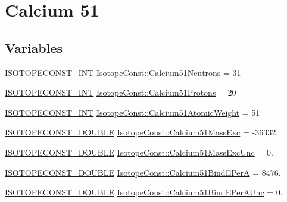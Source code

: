\hypertarget{group___isotope_const-_calcium-_ca51}{}\section{Calcium 51}
\label{group___isotope_const-_calcium-_ca51}
\subsection*{Variables}
\begin{DoxyCompactItemize}
\item 
\mbox{\hyperlink{group___isotope_const-_macros_ga5f18360b3e99483a35c32d789e62621c}{I\+S\+O\+T\+O\+P\+E\+C\+O\+N\+S\+T\+\_\+\+I\+NT}} \mbox{\hyperlink{group___isotope_const-_calcium-_ca51_gabeaa3ad8231b43ea455052977314cfff}{Isotope\+Const\+::\+Calcium51\+Neutrons}} = 31
\item 
\mbox{\hyperlink{group___isotope_const-_macros_ga5f18360b3e99483a35c32d789e62621c}{I\+S\+O\+T\+O\+P\+E\+C\+O\+N\+S\+T\+\_\+\+I\+NT}} \mbox{\hyperlink{group___isotope_const-_calcium-_ca51_gaf172d213a7a0a01c02d3186d903d487e}{Isotope\+Const\+::\+Calcium51\+Protons}} = 20
\item 
\mbox{\hyperlink{group___isotope_const-_macros_ga5f18360b3e99483a35c32d789e62621c}{I\+S\+O\+T\+O\+P\+E\+C\+O\+N\+S\+T\+\_\+\+I\+NT}} \mbox{\hyperlink{group___isotope_const-_calcium-_ca51_ga2e94246098738261c063e210fcd53146}{Isotope\+Const\+::\+Calcium51\+Atomic\+Weight}} = 51
\item 
\mbox{\hyperlink{group___isotope_const-_macros_ga8f45a7272ce02c0b4c65c44636ed719a}{I\+S\+O\+T\+O\+P\+E\+C\+O\+N\+S\+T\+\_\+\+D\+O\+U\+B\+LE}} \mbox{\hyperlink{group___isotope_const-_calcium-_ca51_gab2ba1e5603e8c2fd06f58414e5210765}{Isotope\+Const\+::\+Calcium51\+Mass\+Exc}} = -\/36332.
\item 
\mbox{\hyperlink{group___isotope_const-_macros_ga8f45a7272ce02c0b4c65c44636ed719a}{I\+S\+O\+T\+O\+P\+E\+C\+O\+N\+S\+T\+\_\+\+D\+O\+U\+B\+LE}} \mbox{\hyperlink{group___isotope_const-_calcium-_ca51_gac78973eef37c56e661ec92b6a499260d}{Isotope\+Const\+::\+Calcium51\+Mass\+Exc\+Unc}} = 0.
\item 
\mbox{\hyperlink{group___isotope_const-_macros_ga8f45a7272ce02c0b4c65c44636ed719a}{I\+S\+O\+T\+O\+P\+E\+C\+O\+N\+S\+T\+\_\+\+D\+O\+U\+B\+LE}} \mbox{\hyperlink{group___isotope_const-_calcium-_ca51_gaeb35fe4b8632c996955658866bda9d88}{Isotope\+Const\+::\+Calcium51\+Bind\+E\+PerA}} = 8476.
\item 
\mbox{\hyperlink{group___isotope_const-_macros_ga8f45a7272ce02c0b4c65c44636ed719a}{I\+S\+O\+T\+O\+P\+E\+C\+O\+N\+S\+T\+\_\+\+D\+O\+U\+B\+LE}} \mbox{\hyperlink{group___isotope_const-_calcium-_ca51_ga489981cafe1132403a782a521e0e40c4}{Isotope\+Const\+::\+Calcium51\+Bind\+E\+Per\+A\+Unc}} = 0.

\end{DoxyCompactItemize}
